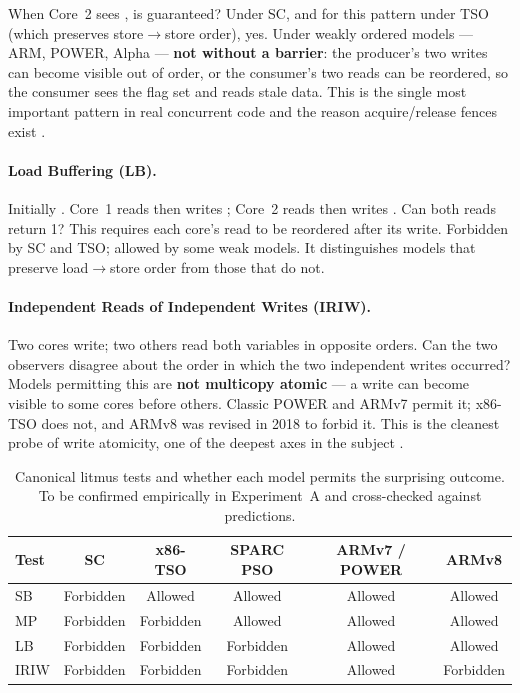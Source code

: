 \noindent When Core~2 sees , is  guaranteed?
Under SC, and for this pattern under TSO (which preserves store$\to$store
order), yes.
Under weakly ordered models --- ARM, POWER, Alpha --- \textbf{not without a
barrier}: the producer's two writes can become visible out of order, or the
consumer's two reads can be reordered, so the consumer sees the flag set and
reads stale data.
This is the single most important pattern in real concurrent code and the reason
acquire/release fences exist \cite{maranget2012tutorial}.

\paragraph{Load Buffering (LB).} Initially .
Core~1 reads  then writes ; Core~2 reads  then writes
.
Can both reads return 1?
This requires each core's read to be reordered after its write.
Forbidden by SC and TSO; allowed by some weak models.
It distinguishes models that preserve load$\to$store order from those that do
not.

\paragraph{Independent Reads of Independent Writes (IRIW).}
Two cores write; two others read both variables in opposite orders.
Can the two observers disagree about the order in which the two independent
writes occurred?
Models permitting this are \textbf{not multicopy atomic} --- a write can become
visible to some cores before others.
Classic POWER and ARMv7 permit it; x86-TSO does not, and ARMv8 was revised in
2018 to forbid it.
This is the cleanest probe of write atomicity, one of the deepest axes in the
subject \cite{alglave2014herding}.

\begin{table}[H]
\centering
\small
\begin{tabular}{@{}lccccc@{}}
\toprule
\textbf{Test} & \textbf{SC} & \textbf{x86-TSO} & \textbf{SPARC PSO} &
\textbf{ARMv7 / POWER} & \textbf{ARMv8} \\
\midrule
SB   & Forbidden & Allowed   & Allowed   & Allowed & Allowed \\
MP   & Forbidden & Forbidden & Allowed   & Allowed & Allowed \\
LB   & Forbidden & Forbidden & Forbidden & Allowed & Allowed \\
IRIW & Forbidden & Forbidden & Forbidden & Allowed & Forbidden \\
\bottomrule
\end{tabular}
\caption{Canonical litmus tests and whether each model permits the surprising
outcome. To be confirmed empirically in Experiment~A and cross-checked against
 predictions.}
\label{tab:d1-litmus}
\end{table}

